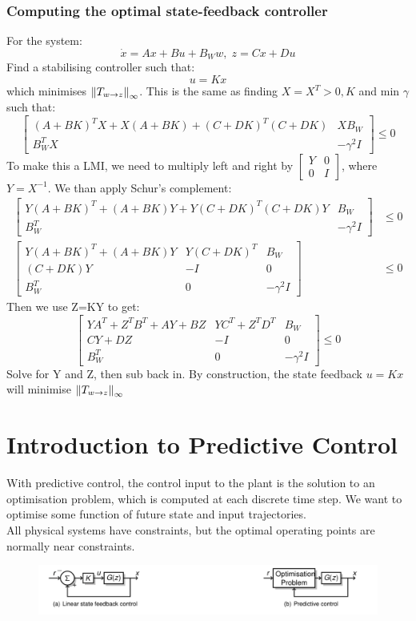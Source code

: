 \documentclass{article}
\begin{document}
\subsubsection*{Computing the optimal state-feedback controller}
For the system:
\[
\dot x = Ax + Bu + B_W w, \; z = Cx + Du
\]
Find a stabilising controller such that:
\[
u = Kx
\]
which minimises $\norm{T_{w \rightarrow z}}_\infty$. This is the same as finding $X = X^T > 0,K$ and min $\gamma$ such that:
\[
\begin{bmatrix}
    (A+BK)^TX + X(A+BK) + (C+DK)^T(C+DK) & XB_W \\
    B_W^TX & -\gamma^2 I
\end{bmatrix} \leq 0
\]
To make this a LMI, we need to multiply left and right by $\begin{bmatrix}
    Y & 0 \\ 0 & I
\end{bmatrix}$, where $Y = X^{-1}$. We than apply Schur's complement:
\[
\begin{aligned}
    \begin{bmatrix}
        Y(A+BK)^T + (A+BK)Y + Y(C+DK)^T(C+DK)Y &B_W \\
        B_W^T & -\gamma^2 I
    \end{bmatrix} &\leq 0 \\
    \begin{bmatrix}
        Y(A+BK)^T + (A+BK)Y & Y(C+DK)^T &B_W \\
        (C+DK)Y & -I & 0 \\
        B_W^T &0 & -\gamma^2 I
    \end{bmatrix} &\leq 0 
\end{aligned}
\]
Then we use Z=KY to get:
\[
\begin{bmatrix}
        YA^T + Z^TB^T + AY +BZ & YC^T + Z^TD^T & B_W \\
        CY+DZ & -I & 0 \\
        B_W^T & 0 & -\gamma^2I
    \end{bmatrix} \leq 0 
\]
Solve for Y and Z, then sub back in. By construction, the state feedback $u=Kx$ will minimise $\norm{T_{w \rightarrow z}}_\infty$
\section{Introduction to Predictive Control}
With predictive control, the control input to the plant is the solution to an optimisation problem, which is computed at each discrete time step. We want to optimise some function of future state and input trajectories. \\
All physical systems have constraints, but the optimal operating points are normally near constraints.
\begin{figure}[H]
    \centering
    \includegraphics[width=0.8\linewidth]{Screenshot 2023-02-17 at 12.35.18.png}
\end{figure}
\end{document}
